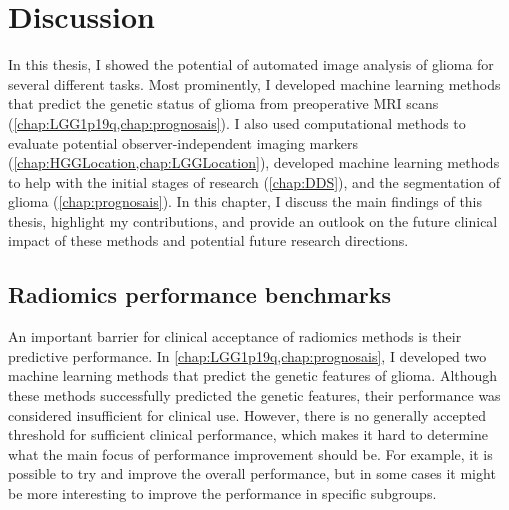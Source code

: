 
\chapter{Discussion}\label{chap:discussion}
\begin{ChapterAbstractNoTitle}
\end{ChapterAbstractNoTitle}
In this thesis, I showed the potential of automated image analysis of glioma for several different tasks.
Most prominently, I developed machine learning methods that predict the genetic status of glioma from preoperative \gls{MRI} scans (\cref{chap:LGG1p19q,chap:prognosais}).
I also used computational methods to evaluate potential observer-independent imaging markers (\cref{chap:HGGLocation,chap:LGGLocation}), developed machine learning methods to help with the initial stages of research (\cref{chap:DDS}), and the segmentation of glioma (\cref{chap:prognosais}).
In this chapter, I discuss the main findings of this thesis, highlight my contributions, and provide an outlook on the future clinical impact of these methods and potential future research directions.

\section{Radiomics performance benchmarks}

An important barrier for clinical acceptance of radiomics methods is their predictive performance.
In \cref{chap:LGG1p19q,chap:prognosais}, I developed two machine learning methods that predict the genetic features of glioma.
Although these methods successfully predicted the genetic features, their performance was considered insufficient for clinical use.
However, there is no generally accepted threshold for sufficient clinical performance, which makes it hard to determine what the main focus of performance improvement should be.
For example, it is possible to try and improve the overall performance, but in some cases it might be more interesting to improve the performance in specific subgroups.

